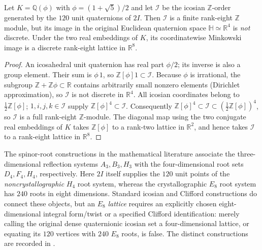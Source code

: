 \documentclass[11pt]{article}
\begin{document}
\begin{proposition}
\label{p1b:prop:v12-icosian-minkowski}
Let $K=\mathbb Q(\phi)$ with $\phi=(1+\sqrt5)/2$ and let
$\mathcal I$ be the icosian $\mathbb Z$-order generated by the
$120$ unit quaternions of $2I$.  Then $\mathcal I$ is a finite
rank-eight $\mathbb Z$ module, but its image in the original
Euclidean quaternion space $\mathbb H\simeq\mathbb R^4$ is
\emph{not} discrete.  Under the two real embeddings of $K$,
its coordinatewise Minkowski image is a discrete rank-eight
lattice in $\mathbb R^8$.
\end{proposition}
\begin{proof}
An icosahedral unit quaternion has real part $\phi/2$; its inverse
is also a group element.  Their sum is $\phi\,1$, so
$\mathbb Z[\phi]1\subset\mathcal I$.  Because $\phi$ is
irrational, the subgroup $\mathbb Z+\mathbb Z\phi\subset\mathbb R$
contains arbitrarily small nonzero elements (Dirichlet
approximation), so $\mathcal I$ is not discrete in $\mathbb R^4$.
All icosian coordinates belong to $\tfrac12\mathbb Z[\phi]$;
$1,i,j,k\in\mathcal I$ supply
$\mathbb Z[\phi]^4\subset\mathcal I$.
Consequently
$\mathbb Z[\phi]^4\subset\mathcal I\subset
(\tfrac12\mathbb Z[\phi])^4$,
so $\mathcal I$ is a full rank-eight $\mathbb Z$-module.
The diagonal map using the two conjugate real embeddings of $K$
takes $\mathbb Z[\phi]$ to a rank-two lattice in $\mathbb R^2$,
and hence takes $\mathcal I$ to a rank-eight lattice in
$\mathbb R^8$.
\end{proof}

\begin{remark}
\label{p1b:rem:v12-h4-e8-boundary}
The spinor-root constructions in the mathematical literature
associate the three-dimensional reflection systems
$A_3,B_3,H_3$ with the four-dimensional root sets
$D_4,F_4,H_4$, respectively.  Here $2I$ itself supplies the
$120$ unit points of the \emph{noncrystallographic} $H_4$
root system, whereas the crystallographic $E_8$ root system
has $240$ roots in eight dimensions.  Standard icosian and
Clifford constructions do connect these objects, but an
$E_8$ \emph{lattice} requires an explicitly chosen eight-dimensional
integral form/twist or a specified Clifford identification:
merely calling the original dense quaternionic icosian set a
four-dimensional lattice, or equating its $120$ vertices with
$240$ $E_8$ roots, is false.  The distinct constructions are
recorded in \cite{Stembridge1999H4,Dechant2016SpinorialE8,
KocaKocAlBarwani2001H4,Baez2017IcosahedronE8}.
\end{remark}
\end{document}
